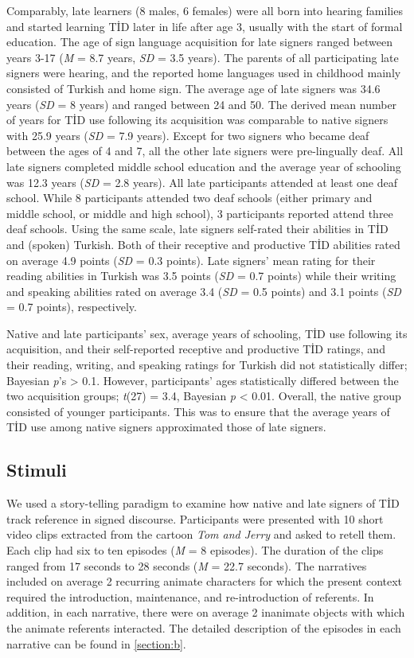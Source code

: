 \documentclass[review]{elsarticle} %
\begin{document}
Comparably, late learners (8 males, 6 females) were all born into
hearing families and started learning TİD later in life after age 3,
usually with the start of formal education. The age of sign language
acquisition for late signers ranged between years 3-17 (\emph{M} = 8.7
years, \emph{SD} = 3.5 years). The parents of all participating late
signers were hearing, and the reported home languages used in childhood
mainly consisted of Turkish and home sign. The average age of late
signers was 34.6 years (\emph{SD} = 8 years) and ranged between 24 and
50. The derived mean number of years for TİD use following its
acquisition was comparable to native signers with 25.9 years (\emph{SD}
= 7.9 years). Except for two signers who became deaf between the ages of
4 and 7, all the other late signers were pre-lingually deaf. All late
signers completed middle school education and the average year of
schooling was 12.3 years (\emph{SD} = 2.8 years). All late participants
attended at least one deaf school. While 8 participants attended two
deaf schools (either primary and middle school, or middle and high
school), 3 participants reported attend three deaf schools. Using the
same scale, late signers self-rated their abilities in TİD and (spoken)
Turkish. Both of their receptive and productive TİD abilities rated on
average 4.9 points (\emph{SD} = 0.3 points). Late signers' mean rating
for their reading abilities in Turkish was 3.5 points (\emph{SD} = 0.7
points) while their writing and speaking abilities rated on average 3.4
(\emph{SD} = 0.5 points) and 3.1 points (\emph{SD} = 0.7 points),
respectively.

Native and late participants' sex, average years of schooling, TİD use
following its acquisition, and their self-reported receptive and
productive TİD ratings, and their reading, writing, and speaking ratings
for Turkish did not statistically differ; Bayesian \emph{p}'s
\textgreater{} 0.1. However, participants' ages statistically differed
between the two acquisition groups; \emph{t}(27) = 3.4, Bayesian
\emph{p} \textless{} 0.01. Overall, the native group consisted of
younger participants. This was to ensure that the average years of TİD
use among native signers approximated those of late signers.

\hypertarget{stimuli}{%
\subsection{Stimuli}\label{stimuli}}

We used a story-telling paradigm to examine how native and late signers
of TİD track reference in signed discourse. Participants were presented
with 10 short video clips extracted from the cartoon \emph{Tom and
Jerry} and asked to retell them. Each clip had six to ten episodes
(\emph{M} = 8 episodes). The duration of the clips ranged from 17
seconds to 28 seconds (\emph{M} = 22.7 seconds). The narratives included
on average 2 recurring animate characters for which the present context
required the introduction, maintenance, and re-introduction of
referents. In addition, in each narrative, there were on average 2
inanimate objects with which the animate referents interacted. The
detailed description of the episodes in each narrative can be found in
\ref{section:b}.
\end{document}
